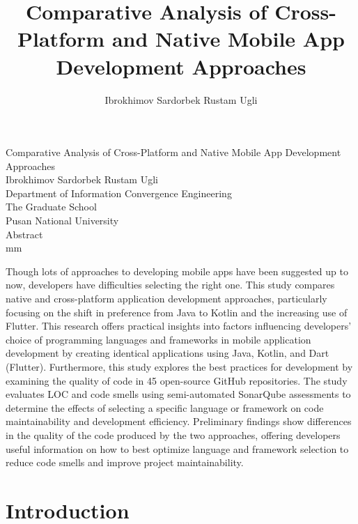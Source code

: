 \documentclass[11pt,jaso]{pnumasterh}
\title{Comparative Analysis of Cross-Platform and Native Mobile App Development Approaches}
\author{Ibrokhimov Sardorbek Rustam Ugli}
\begin{document}
\maketitle 
\pagestyle{empty}

\newpage
\pagestyle{plain} 

\setlength\cftsecnumwidth{2.3em}

\tableofcontents
\newpage
\listoffigures 
\newpage
\listoftables 


\newpage
\thispagestyle{empty}
\begin{center}
    \vskip 3.5cm
    {\Large{Comparative Analysis of Cross-Platform and Native Mobile App Development Approaches}} \\
    \vskip 15mm
    {\large{Ibrokhimov Sardorbek Rustam Ugli}} \\
    \vskip 10mm
    {Department of Information Convergence Engineering} \\
    {The Graduate School} \\
    {Pusan National University} \\
    \vskip 15mm
    {\large{Abstract}}\\
     mm
\end{center}

Though lots of approaches to developing mobile apps have been suggested up to now, developers have difficulties selecting the right one. This study compares native and cross-platform application development approaches, particularly focusing on the shift in preference from Java to Kotlin and the increasing use of Flutter. This research offers practical insights into factors influencing developers’ choice of programming languages and frameworks in mobile application development by creating identical applications using Java, Kotlin, and Dart (Flutter). Furthermore, this study explores the best practices for development by examining the quality of code in 45 open-source GitHub repositories. The study evaluates LOC and code smells using semi-automated SonarQube assessments to determine the effects of selecting a specific language or framework on code maintainability and development efficiency. Preliminary findings show differences in the quality of the code produced by the two approaches, offering developers useful information on how to best optimize language and framework selection to reduce code smells and improve project maintainability.    
\newpage
{}

\section{Introduction}

\clearpage
\end{document}
